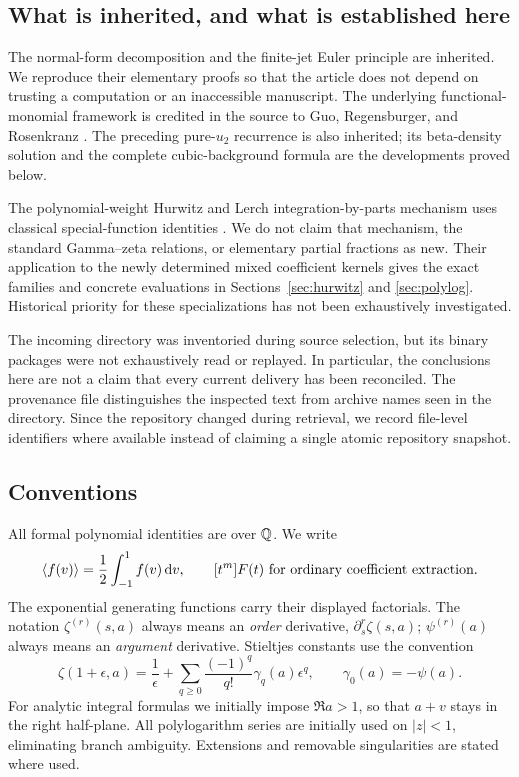 \subsection{What is inherited, and what is established here}
The normal-form decomposition and the finite-jet Euler principle are
inherited. We reproduce their elementary proofs so that the article does
not depend on trusting a computation or an inaccessible manuscript.
The underlying functional-monomial framework is credited in the source to
Guo, Regensburger, and Rosenkranz \cite{GRR}. The preceding pure-$u_2$
recurrence is also inherited; its beta-density solution and the complete
cubic-background formula are the developments proved below.

The polynomial-weight Hurwitz and Lerch integration-by-parts mechanism
uses classical special-function identities \cite{DLMF25,DLMF14}. We do not
claim that mechanism, the standard Gamma--zeta relations, or elementary
partial fractions as new. Their application to the newly determined mixed
coefficient kernels gives the exact families and concrete evaluations in
Sections~\ref{sec:hurwitz} and \ref{sec:polylog}. Historical priority for
these specializations has not been exhaustively investigated.

The incoming directory was inventoried during source selection, but its
binary packages were not exhaustively read or replayed. In particular,
the conclusions here are not a claim that every current delivery has been
reconciled. The provenance file distinguishes the inspected text from
archive names seen in the directory. Since the repository changed during
retrieval, we record file-level identifiers where available instead of
claiming a single atomic repository snapshot.

\subsection{Conventions}
All formal polynomial identities are over $\mathbb Q$. We write
\[
 \left\langle f(v)\right\rangle=\frac12\int_{-1}^1f(v)\,\mathrm d v,
 \qquad [t^m]F(t)\text{ for ordinary coefficient extraction}.
\]
The exponential generating functions carry their displayed factorials.
The notation $\zeta^{(r)}(s,a)$ always means an \emph{order} derivative,
$\partial_s^r\zeta(s,a)$; $\psi^{(r)}(a)$ always means an \emph{argument}
derivative. Stieltjes constants use the convention
\begin{equation}\label{eq:stieltjes-convention}
 \zeta(1+\epsilon,a)=\frac1\epsilon+
 \sum_{q\ge0}\frac{(-1)^q}{q!}\gamma_q(a)\epsilon^q,
 \qquad \gamma_0(a)=-\psi(a).
\end{equation}
For analytic integral formulas we initially impose $\Re a>1$, so that
$a+v$ stays in the right half-plane. All polylogarithm series are initially
used on $|z|<1$, eliminating branch ambiguity. Extensions and removable
singularities are stated where used.

